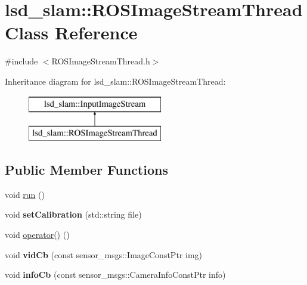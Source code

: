 \hypertarget{classlsd__slam_1_1_r_o_s_image_stream_thread}{\section{lsd\-\_\-slam\-:\-:R\-O\-S\-Image\-Stream\-Thread Class Reference}
\label{classlsd__slam_1_1_r_o_s_image_stream_thread}
}


{\ttfamily \#include $<$R\-O\-S\-Image\-Stream\-Thread.\-h$>$}

Inheritance diagram for lsd\-\_\-slam\-:\-:R\-O\-S\-Image\-Stream\-Thread\-:\begin{figure}[H]
\begin{center}
\leavevmode
\includegraphics[height=2.000000cm]{classlsd__slam_1_1_r_o_s_image_stream_thread}
\end{center}
\end{figure}
\subsection*{Public Member Functions}
\begin{DoxyCompactItemize}
\item 
void \hyperlink{classlsd__slam_1_1_r_o_s_image_stream_thread_a8d20574101837956cdebe14761c368fc}{run} ()
\item 
\hypertarget{classlsd__slam_1_1_r_o_s_image_stream_thread_a5567cf59a4603c5bfe818ef78c58b1c0}{void {\bfseries set\-Calibration} (std\-::string file)}\label{classlsd__slam_1_1_r_o_s_image_stream_thread_a5567cf59a4603c5bfe818ef78c58b1c0}

\item 
void \hyperlink{classlsd__slam_1_1_r_o_s_image_stream_thread_a93b7630a508fd900b8bfaec19235016f}{operator()} ()
\item 
\hypertarget{classlsd__slam_1_1_r_o_s_image_stream_thread_a2d10e72133d60039a752cbbe8a7140e8}{void {\bfseries vid\-Cb} (const sensor\-\_\-msgs\-::\-Image\-Const\-Ptr img)}\label{classlsd__slam_1_1_r_o_s_image_stream_thread_a2d10e72133d60039a752cbbe8a7140e8}

\item 
\hypertarget{classlsd__slam_1_1_r_o_s_image_stream_thread_abfe05966e4a0e232e5433fc27bd78139}{void {\bfseries info\-Cb} (const sensor\-\_\-msgs\-::\-Camera\-Info\-Const\-Ptr info)}\label{classlsd__slam_1_1_r_o_s_image_stream_thread_abfe05966e4a0e232e5433fc27bd78139}

\end{DoxyCompactItemize}

